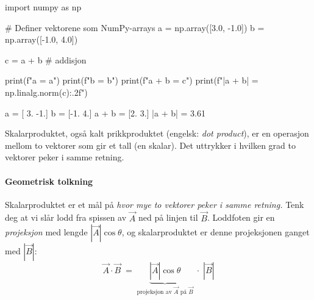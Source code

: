 \begin{pythonkode}
import numpy as np

# Definer vektorene som NumPy-arrays
a = np.array([3.0, -1.0])
b = np.array([-1.0,  4.0])

c = a + b   # addisjon

print(f"a       = {a}")
print(f"b       = {b}")
print(f"a + b   = {c}")
print(f"|a + b| = {np.linalg.norm(c):.2f}")
\end{pythonkode}
\begin{pythonoutput}
a       = [ 3. -1.]
b       = [-1.  4.]
a + b   = [2. 3.]
|a + b| = 3.61
\end{pythonoutput}


Skalarproduktet, også kalt prikkproduktet (engelsk: \textit{dot product}), er en operasjon mellom to vektorer som gir et tall (en skalar). Det uttrykker i hvilken grad to vektorer peker i samme retning.


\paragraph{Geometrisk tolkning}

Skalarproduktet er et mål på \emph{hvor mye to vektorer peker i samme retning.} Tenk deg at vi slår lodd fra spissen av $\vec{A}$ ned på linjen til $\vec{B}$. Loddfoten gir en \emph{projeksjon} med lengde $|\vec{A}|\cos\theta$, og skalarproduktet er denne projeksjonen ganget med $|\vec{B}|$:
\[
\vec{A}\cdot\vec{B} \;=\;
\underbrace{|\vec{A}|\cos\theta}_{\text{projeksjon av }\vec{A}\text{ på }\vec{B}}
\;\cdot\; |\vec{B}|
\]

